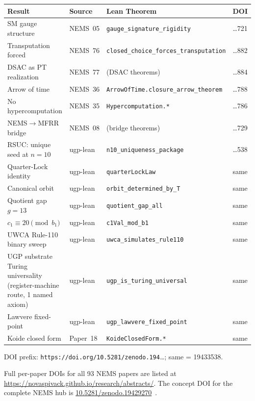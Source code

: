 \documentclass[12pt]{article}
\numberwithin{equation}{section}
\begin{document}
\begin{center}
\renewcommand{\arraystretch}{1.25}
\footnotesize
\begin{tabular}{@{}p{3.4cm}p{1.8cm}p{5.2cm}p{1.4cm}@{}}
\toprule
\textbf{Result} & \textbf{Source} & \textbf{Lean Theorem} & \textbf{DOI} \\
\midrule
SM gauge structure & NEMS~05 & \texttt{gauge\_signature\_\allowbreak{}rigidity} & …721 \\
Transputation forced & NEMS~76 & \texttt{closed\_choice\_forces\_\allowbreak{}transputation} & …882 \\
DSAC as PT realization & NEMS~77 & (DSAC theorems) & …884 \\
Arrow of time & NEMS~36 & \texttt{ArrowOfTime.\allowbreak{}closure\_arrow\_theorem} & …788 \\
No hypercomputation & NEMS~35 & \texttt{Hypercomputation.*} & …786 \\
NEMS$\to$MFRR bridge & NEMS~08 & (bridge theorems) & …729 \\
RSUC: unique seed at $n{=}10$ & ugp-lean & \texttt{n10\_uniqueness\_\allowbreak{}package} & …538 \\
Quarter-Lock identity & ugp-lean & \texttt{quarterLockLaw} & same \\
Canonical orbit & ugp-lean & \texttt{orbit\_determined\_by\_T} & same \\
Quotient gap $g=13$ & ugp-lean & \texttt{quotient\_gap\_all} & same \\
$c_1 \equiv 20 \pmod{b_1}$ & ugp-lean & \texttt{c1Val\_mod\_b1} & same \\
UWCA Rule-110 binary sweep & ugp-lean & \texttt{uwca\_simulates\_rule110} & same \\
UGP substrate Turing universality (register-machine route, 1 named axiom) & ugp-lean & \texttt{ugp\_is\_turing\_universal} & same \\
Lawvere fixed-point & ugp-lean & \texttt{ugp\_lawvere\_fixed\_point} & same \\
Koide closed form & Paper~18 & \texttt{KoideClosedForm.*} & same \\
\bottomrule
\end{tabular}
\noindent\footnotesize DOI prefix: \texttt{https://doi.org/10.5281/zenodo.194}\ldots; same = 19433538.
\normalsize
\end{center}

\smallskip
\noindent Full per-paper DOIs for all 93 NEMS papers are listed at \url{https://novaspivack.github.io/research/abstracts/}. The concept DOI for the complete NEMS hub is \href{https://doi.org/10.5281/zenodo.19429270}{10.5281/zenodo.19429270}~\cite{SpivackNEMSHub}.
\end{document}
